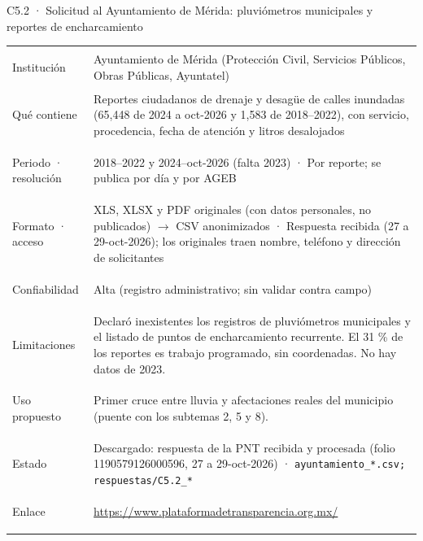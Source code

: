 \documentclass[11pt,a4paper]{article}
\begin{document}
\begin{ficha}{C5.2 · Solicitud al Ayuntamiento de Mérida: pluviómetros municipales y reportes de encharcamiento}
\begin{tabularx}{\linewidth}{@{}>{\leavevmode\color{tinta2}\bfseries\raggedright\arraybackslash}p{2.9cm}X@{}}
Institución & Ayuntamiento de Mérida (Protección Civil, Servicios Públicos, Obras Públicas, Ayuntatel) \\
Qué contiene & Reportes ciudadanos de drenaje y desagüe de calles inundadas (65,448 de 2024 a oct-2026 y 1,583 de 2018–2022), con servicio, procedencia, fecha de atención y litros desalojados \\
Periodo · resolución & 2018–2022 y 2024–oct-2026 (falta 2023) · Por reporte; se publica por día y por AGEB \\
Formato · acceso & XLS, XLSX y PDF originales (con datos personales, no publicados) $\rightarrow$ CSV anonimizados · Respuesta recibida (27 a 29-oct-2026); los originales traen nombre, teléfono y dirección de solicitantes \\
Confiabilidad & Alta (registro administrativo; sin validar contra campo) \\
Limitaciones & Declaró inexistentes los registros de pluviómetros municipales y el listado de puntos de encharcamiento recurrente. El 31 \% de los reportes es trabajo programado, sin coordenadas. No hay datos de 2023. \\
Uso propuesto & Primer cruce entre lluvia y afectaciones reales del municipio (puente con los subtemas 2, 5 y 8). \\
Estado & Descargado: respuesta de la PNT recibida y procesada (folio 1190579126000596, 27 a 29-oct-2026) · {\small\nolinkurl{ayuntamiento_*.csv; respuestas/C5.2_*}} \\
Enlace & \url{https://www.plataformadetransparencia.org.mx/} \\
\end{tabularx}
\end{ficha}
\end{document}
